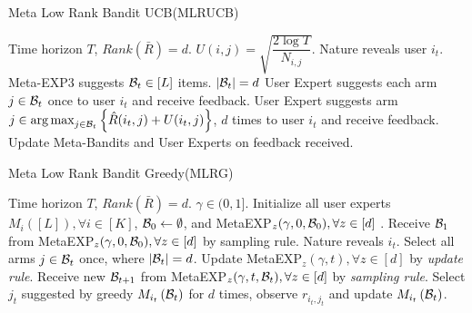 \begin{algorithm}[!th]
\caption{Meta Low Rank Bandit UCB(MLRUCB)}
\label{alg:mLRBS2}
\begin{algorithmic}[1]
 Time horizon $T$, $Rank(\bar{R}) = d$.
 $U(i,j) = \sqrt{\dfrac{2\log T}{N_{i,j}}}$.
\State Nature reveals user $i_t$.  
\State Meta-EXP3 suggests $\mathcal{B}_t\in[L]$ items. $|\mathcal{B}_t| = d$
	 
\State User Expert suggests each arm $j\in\mathcal{B}_t$ once to user $i_t$ and receive feedback.
\Else {}
\State User Expert suggests arm $j\in \mathop{\rm arg\,max}_{j\in\mathcal{B}_t}\left\lbrace \hat{R}(i_t,j) + U(i_t,j)\right\rbrace$, $d$ times to user $i_t$ and receive feedback.
\EndIf
\State Update Meta-Bandits and User Experts on feedback received.
\EndFor
\end{algorithmic}
\end{algorithm}



\begin{algorithm}[!th]
\caption{Meta Low Rank Bandit Greedy(MLRG)}
\label{alg:mLRBG}
\begin{algorithmic}[1]
 Time horizon $T$, $Rank(\bar{R}) = d$.
 $\gamma \in (0,1]$.
 Initialize all user experts $M_{i}\left( [L]\right), \forall i\in [K]$,  $\mathcal{B}_0\leftarrow \emptyset$, and MetaEXP$_{z}(\gamma, 0, \mathcal{B}_0),\forall z\in[d]$ .
\State Receive $\mathcal{B}_1$ from MetaEXP$_z(\gamma, 0, \mathcal{B}_0),\forall z\in[d]$ by sampling rule.
\State Nature reveals $i_t$.  
\State Select all arms $j\in \mathcal{B}_t$ once, where $|\mathcal{B}_t| = d$.
\State Update MetaEXP$_{z}(\gamma, t),\forall z\in[d]$ by
\textit{update rule}. 
\State Receive new $\mathcal{B}_{t+1}$ from MetaEXP$_z(\gamma, t, \mathcal{B}_t),\forall z\in[d]$ by \textit{sampling rule}.
\EndFor
{} 
\State Select $j_t$ suggested by greedy $M_{i_t}\left( \mathcal{B}_t \right)$ for $d$ times, observe $r_{i_t,j_t}$ and update $M_{i_t}\left( \mathcal{B}_t \right)$. 
\EndFor
\EndFor
\end{algorithmic}
\end{algorithm}






